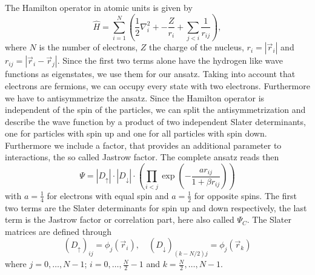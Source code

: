 \documentclass[a4paper,10pt]{article}
\begin{document}
The Hamilton operator in atomic units is given by
\begin{equation}
 \hat H = \sum_{i=1}^{N} \left( \frac12 \nabla_i^2 +  -\frac{Z}{r_i} + \sum_{j<i} \frac{1}{r_{ij}} \right),
\end{equation}
where $N$ is the number of electrons, $Z$ the charge of the nucleus, $r_i = |\vec{r}_i|$ and $r_{ij} = |\vec{r}_i -\vec{r}_j|$. 
Since the first two terms alone have the hydrogen like wave functions as eigenstates, we use them for our ansatz. Taking into account that electrons are fermions, we 
can occupy every state with two electrons. Furthermore we have to antisymmetrize the ansatz. Since the Hamilton operator is independent of the spin of the particles,
we can split the antisymmetrization and describe the wave function by a product of two independent Slater determinants, 
one for particles with spin up and one for all particles with spin down. 
Furthermore we include a factor, that provides an additional parameter to  interactions, the so called Jastrow factor. 
The complete ansatz reads then
\begin{equation}
 \Psi = |D_{\uparrow}|\cdot|D_{\downarrow}|\cdot\left(\prod_{i<j} \exp \left(-\frac{ar_{ij}}{1+\beta r_{ij}}\right) \right)
\end{equation}
with $a=\frac14$ for electrons with equal spin and $a=\frac12$ for opposite spins.
The first two terms are the Slater determinants for spin up and down respectively, the last term is the Jastrow factor or correlation part, here also called $\Psi_C$.
The Slater matrices are defined through
\begin{equation} 
 (D_{\uparrow})_{ij} = \phi_j(\vec{r}_i), \quad (D_{\downarrow})_{\left(k-N/2\right)j} = \phi_j(\vec{r}_k)
\end{equation}
where $j=0,\dots,N-1$; $i=0,\dots ,\frac{N}{2}-1$ and $k=\frac{N}{2},\dots, N-1$.
\end{document}
